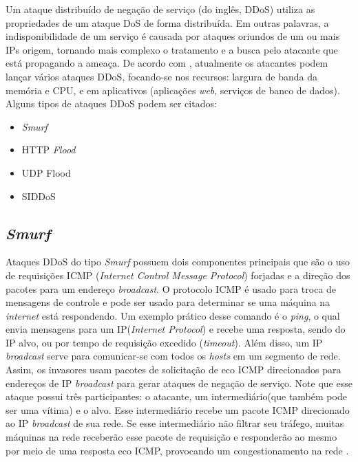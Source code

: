 Um ataque distribuído de negação de serviço (do inglês, DDoS) utiliza as propriedades de um ataque DoS de forma distribuída. Em outras palavras, a indisponibilidade de um serviço é causada por ataques oriundos de um ou mais IPs origem, tornando mais complexo o tratamento e a busca pelo atacante que está propagando a ameaça. De acordo com , atualmente os atacantes podem lançar vários ataques DDoS, focando-se nos recursos: largura de banda da memória e CPU, e em aplicativos (aplicações \textit{web}, serviços de banco de dados). Alguns tipos de ataques DDoS podem ser citados:\cite{DataMining}

\begin{itemize}
	 \item \textit{Smurf}
	 \item HTTP \textit{Flood}
	 \item UDP Flood
	 \item SIDDoS
\end{itemize}

\subsection{\textit{Smurf}}
Ataques DDoS do tipo \textit{Smurf} possuem dois componentes principais que são o uso de requisições ICMP (\textit{Internet Control Message Protocol}) forjadas e a direção dos pacotes para um endereço \textit{broadcast}. O protocolo ICMP  é usado para troca de mensagens de controle e pode ser usado para determinar se uma máquina na \textit{internet} está respondendo. Um exemplo prático desse comando é o \textit{ping}, o qual envia mensagens para um IP(\textit{Internet Protocol}) e recebe uma resposta, sendo do IP alvo, ou por tempo de requisição excedido (\textit{timeout}). Além disso, um IP \textit{broadcast} serve para comunicar-se com todos os \textit{hosts} em um segmento de rede. Assim, os invasores usam pacotes de solicitação de eco ICMP direcionados para endereços de IP \textit{broadcast} para gerar ataques de negação de serviço. Note que esse ataque possui três participantes: o atacante, um intermediário(que também pode ser uma vítima) e o alvo. Esse intermediário recebe um pacote ICMP direcionado ao IP \textit{broadcast} de sua rede. Se esse intermediário não filtrar seu tráfego, muitas máquinas na rede receberão esse pacote de requisição e responderão ao mesmo por meio de uma resposta eco ICMP, provocando um congestionamento na rede \cite{certSmurf}.
